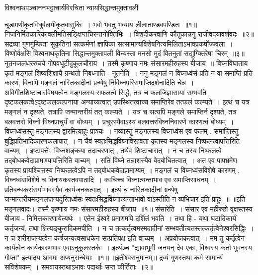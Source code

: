 ﻿%


विश्वनाथपञ्चाननभट्टाचार्यविरचिता न्यायसिद्धान्तमुक्तावली

चूडामणीकृतविधुर्वलयीकृतवासुकिः~।
भवो भवतु भव्याय लीलाताण्डवपण्डितः~॥१॥
निजनिर्मितकारिकावलीमतिसङ्क्षिप्तचिरन्तनोक्तिभिः~।
विशदीकरवाणि कौतुकान्ननु राजीवदयावशंवदः~॥२॥
सद्रव्या गुणगुम्फिता सुकृतिनां सत्कर्मणां ज्ञापिका
सत्सामान्यविशेषनित्यमिलिताऽभावप्रकर्षोज्ज्वला~।
विष्णोर्वक्षसि विश्वनाथकृतिना सिद्धान्तमुक्तावली
विन्यस्ता मनसो मुदं वितनुतां सद्युग्क्तिरेषा चिरम्~॥३॥
नूतनजलधररुचये गोपवधूटीदुकूलचौराय~।
तस्मै कृष्णाय नमः संसारमहीरुहस्य बीजाय~॥
विघ्नविघाताय कृतं मङ्गलं शिष्यशिक्षायै ग्रन्थतो निबध्नाति - नूतनेति~। ननु मङ्गलं न विघ्नध्वंसं प्रति न वा समाप्तिं प्रति कारणं, विनापि मङ्गलं नास्तिकादीनां प्रन्थेषु निर्विघ्नपरिसमाप्तिदर्शनादिति चेन्न~। अविगीतशिष्टाचारविषयत्वेन मङ्गलस्य सफलत्वे सिद्धे, तत्र च फलजिज्ञासायां सम्भवति
दृष्टफलकत्वेऽदृष्टफलकल्पनाया अन्याय्यत्वात् उपस्थितत्वाच्च समाप्तिरेव तत्फलं कल्प्यते~। इत्थं च यत्र मङ्गलं न दृश्यते, तत्रापि जन्मान्तरीयं तत् कल्प्यते~। यत्र च
सत्यपि मङ्गले समाप्तिर्न दृश्यते, तत्र बलवत्तरो विघ्नो विघ्नप्राचुर्यं वा बोध्यम्~। प्रचुरस्यैवाऽस्य बलवत्तरविघ्ननिवारणे कारणत्वं बोध्यम्~। विघ्नध्वंसस्तु मङ्गलस्य
द्वारमित्याहुः प्राञ्चः~।
नव्यास्तु मङ्गलस्य विघ्नध्वंस एव फलम् , समाप्तिस्तु बुद्धिप्रतिभादिकारणकलापात्~। न चैवं स्वतःसिद्धविघ्नविरहवता कृतस्य मङ्गलस्य निष्फलत्वापत्तिरिति
वाच्यम्~। इष्टापत्तेः, विघ्नशङ्कया तदाचरणात् , तथैव शिष्टाचारात्~। न च तस्य निष्फलत्वे तद्बोधकवेदाप्रामाण्यापत्तिरिति वाच्यम्~। सति विघ्ने तन्नाशस्यैव वेदबोधितत्वात्~।
अत एव पापभ्रमेण कृतस्य प्रायश्चित्तस्य निष्फलत्वेऽपि न तद्बोधकवेदाप्रामाण्यम्~। मङ्गलं च विघ्नध्वंसविशेषे कारणम् , विघ्नध्वंसविशेषे च विनायकस्तवपाठादि~।
क्वचिच्च विघ्नात्यन्ताभाव एव समाप्तिसाधनम्~। प्रतिबन्धकसंसर्गाभावस्यैव कार्यजनकत्वात्~। इत्थं च नास्तिकादीनां ग्रन्थेषु जन्मान्तरीयमङ्गलजन्यदुरितध्वंसः स्वतःसिद्धविघ्नात्यन्ताभावो वाऽस्तीति न व्यभिचार इति प्राहुः~॥
॥इति मङ्गलवादः॥
तस्मै कृष्णाय नमः संसारमहीरुहस्य बीजाय~॥१॥
संसारेति~। संसार एव महीरुहो वृक्षस्तस्य बीजाय - निमित्तकारणायेत्यर्थः~।
एतेन ईश्वरे प्रमाणमपि दर्शितं भवति~। तथा हि - यथा घटादिकार्यं कर्तृजन्यं, तथा क्षित्यङ्कुरादिकमपीति~। न च तत्कर्तृत्वमस्मदादीनां सम्भवतीत्यतस्तत्कर्तृत्वेनेश्वरसिद्धिः~।
न च शरीराजन्यत्वेन कर्त्रजन्यत्वसाधकेन सत्प्रतिपक्ष इति वाच्यम्~। अप्रयोजकत्वात्~। मम तु कर्तृत्वेन कार्यत्वेन कार्यकारणभाव एवाऽनुकूलस्तर्कः~। इत्थंञ्च "द्यावाभूमी
जनयन् देव एकः, विश्वस्य कर्ता भुवनस्य गोप्ता" इत्यादय आगमा अप्यनुसन्धेयाः~॥१॥
॥इतीश्वरानुमानम्॥
द्रव्यं गुणस्तथा कर्म सामान्यं सविशेषकम्~।
समवायस्तथाऽभावः पदार्थाः सप्त कीर्तिताः~॥२॥
